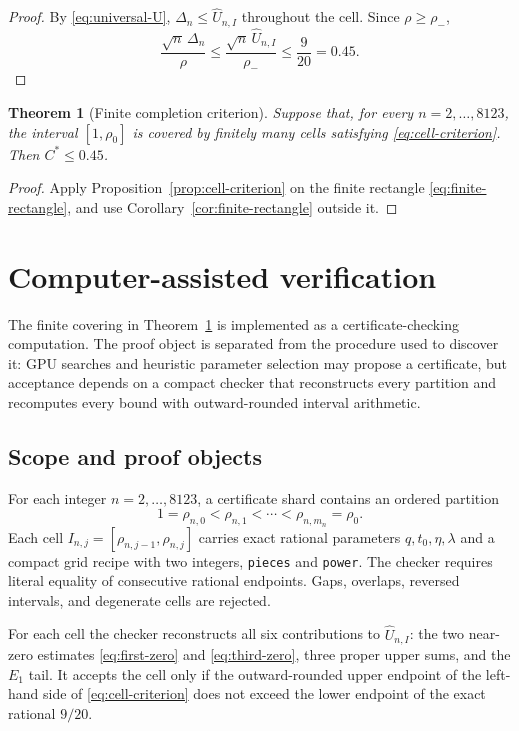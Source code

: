 \documentclass[11pt,a4paper,twoside]{article}
\newtheorem{theorem}{Theorem}[section]
\theoremstyle{remark}
\newcommand{\rhozero}{\rho_{0}}
\newcommand{\Cstar}{C^{\ast}}
\newcommand{\Uhat}{\widehat U}
\newcommand{\code}[1]{\texttt{#1}}
\begin{document}
\begin{proof}
By \eqref{eq:universal-U},
\(\Delta_n\le\Uhat_{n,I}\) throughout the cell.  Since
\(\rho\ge\rho_-\),
\[
 \frac{\sqrt n\,\Delta_n}{\rho}
 \le
 \frac{\sqrt n\,\Uhat_{n,I}}{\rho_-}
 \le\frac9{20}=0.45.
\]
\end{proof}

\begin{theorem}[Finite completion criterion]\label{thm:finite-completion}
Suppose that, for every \(n=2,\ldots,8123\), the interval
\([1,\rhozero]\) is covered by finitely many cells satisfying
\eqref{eq:cell-criterion}.  Then \(\Cstar\le0.45\).
\end{theorem}

\begin{proof}
Apply Proposition~\ref{prop:cell-criterion} on the finite rectangle
\eqref{eq:finite-rectangle}, and use
Corollary~\ref{cor:finite-rectangle} outside it.
\end{proof}

\section{Computer-assisted verification}
\label{sec:computer-verification}

The finite covering in Theorem~\ref{thm:finite-completion} is implemented as
a certificate-checking computation.  The proof object is separated from the
procedure used to discover it: GPU searches and heuristic parameter selection
may propose a certificate, but acceptance depends on a compact checker that
reconstructs every partition and recomputes every bound with outward-rounded
interval arithmetic.

\subsection{Scope and proof objects}

For each integer \(n=2,\ldots,8123\), a certificate shard contains an
ordered partition
\[
 1=\rho_{n,0}<\rho_{n,1}<\cdots<\rho_{n,m_n}=\rhozero.
\]
Each cell
\(I_{n,j}=[\rho_{n,j-1},\rho_{n,j}]\) carries exact rational
parameters \(q,t_0,\eta,\lambda\) and a compact grid recipe with two
integers, \code{pieces} and \code{power}.  The checker requires literal
equality of consecutive rational endpoints.  Gaps, overlaps, reversed
intervals, and degenerate cells are rejected.

For each cell the checker reconstructs all six contributions to
\(\Uhat_{n,I}\): the two near-zero estimates
\eqref{eq:first-zero} and \eqref{eq:third-zero}, three proper upper sums,
and the \(E_1\) tail.  It accepts the cell only if the outward-rounded upper
endpoint of the left-hand side of \eqref{eq:cell-criterion} does not exceed
the lower endpoint of the exact rational \(9/20\).
\end{document}
